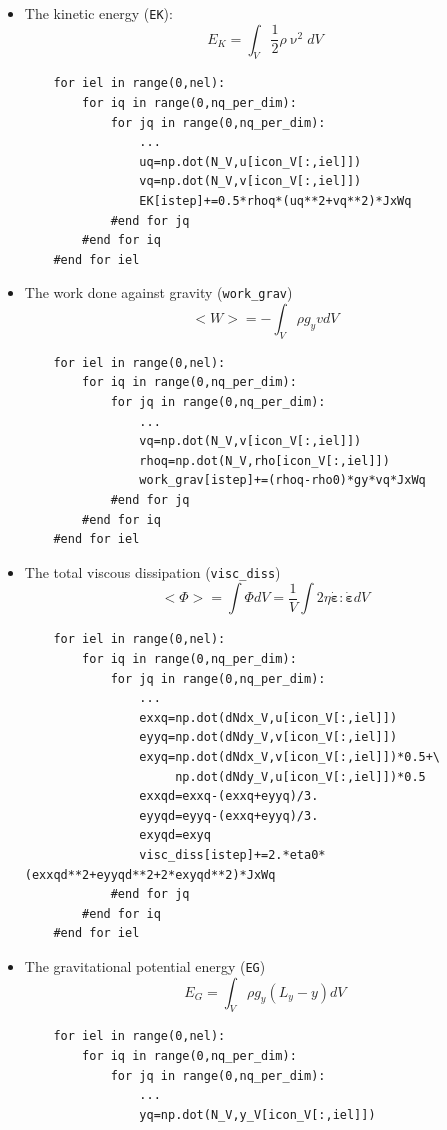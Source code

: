 \begin{itemize}
\item The kinetic energy (\lstinline{EK}):
\[
E_K=\int_V \frac{1}{2}\rho \upnu^2 dV
\]
\begin{lstlisting}
    for iel in range(0,nel):
        for iq in range(0,nq_per_dim):
            for jq in range(0,nq_per_dim):
                ...
                uq=np.dot(N_V,u[icon_V[:,iel]])
                vq=np.dot(N_V,v[icon_V[:,iel]])
                EK[istep]+=0.5*rhoq*(uq**2+vq**2)*JxWq
            #end for jq
        #end for iq
    #end for iel
\end{lstlisting}

\item The work done against gravity (\lstinline{work_grav})
\[
<W>=-\int_V \rho g_y v dV
\]
\begin{lstlisting}
    for iel in range(0,nel):
        for iq in range(0,nq_per_dim):
            for jq in range(0,nq_per_dim):
                ...
                vq=np.dot(N_V,v[icon_V[:,iel]])
                rhoq=np.dot(N_V,rho[icon_V[:,iel]])
                work_grav[istep]+=(rhoq-rho0)*gy*vq*JxWq 
            #end for jq
        #end for iq
    #end for iel
\end{lstlisting}
\item The total viscous dissipation (\lstinline{visc_diss})
\[
<\Phi>=\int \Phi dV =\frac{1}{V}\int 2 \eta \dot{\bm \varepsilon}:\dot{\bm \varepsilon} dV 
\]
\begin{lstlisting}
    for iel in range(0,nel):
        for iq in range(0,nq_per_dim):
            for jq in range(0,nq_per_dim):
                ...
                exxq=np.dot(dNdx_V,u[icon_V[:,iel]])
                eyyq=np.dot(dNdy_V,v[icon_V[:,iel]])
                exyq=np.dot(dNdx_V,v[icon_V[:,iel]])*0.5+\
                     np.dot(dNdy_V,u[icon_V[:,iel]])*0.5
                exxqd=exxq-(exxq+eyyq)/3.
                eyyqd=eyyq-(exxq+eyyq)/3.
                exyqd=exyq
                visc_diss[istep]+=2.*eta0*(exxqd**2+eyyqd**2+2*exyqd**2)*JxWq
            #end for jq
        #end for iq
    #end for iel
\end{lstlisting}
\item The gravitational potential energy (\lstinline{EG})
\[
E_G = \int_V \rho g_y (L_y-y) dV
\]
\begin{lstlisting}
    for iel in range(0,nel):
        for iq in range(0,nq_per_dim):
            for jq in range(0,nq_per_dim):
                ...
                yq=np.dot(N_V,y_V[icon_V[:,iel]])

\end{lstlisting}
\end{itemize}
